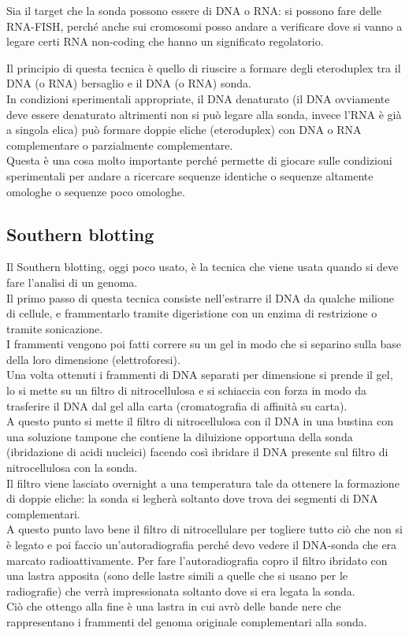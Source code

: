 \documentclass[11pt]{book}
\begin{document}
Sia il target che la sonda possono essere di DNA o RNA: si possono fare delle RNA-FISH, perché anche sui cromosomi posso andare a verificare dove si vanno a legare certi RNA non-coding che hanno un significato regolatorio.

Il principio di questa tecnica è quello di riuscire a formare degli eteroduplex tra il DNA (o RNA) bersaglio e il DNA (o RNA) sonda.\\
In condizioni sperimentali appropriate, il DNA denaturato (il DNA ovviamente deve essere denaturato altrimenti non si può legare alla sonda, invece l’RNA è già a singola elica) può formare doppie eliche (eteroduplex) con DNA o RNA complementare o parzialmente complementare.\\ Questa è una cosa molto importante perché permette di giocare sulle condizioni sperimentali per andare a ricercare sequenze identiche o sequenze altamente omologhe o sequenze poco omologhe.


\subsection{Southern blotting}
Il Southern blotting, oggi poco usato, è la tecnica che viene usata quando si deve fare l’analisi di un genoma.\\
Il primo passo di questa tecnica consiste nell'estrarre il DNA da qualche milione di cellule, e frammentarlo tramite digeristione con un enzima di restrizione o tramite sonicazione.\\
I frammenti vengono poi fatti correre su un gel in modo che si separino sulla base della loro dimensione (elettroforesi).\\
Una volta ottenuti i frammenti di DNA separati per dimensione si prende il gel, lo si mette su un filtro di nitrocellulosa e si schiaccia con forza in modo da trasferire il DNA dal gel alla carta (cromatografia di affinità su carta).\\
A questo punto si mette il filtro di nitrocellulosa con il DNA in una bustina con una soluzione tampone che contiene la diluizione opportuna della sonda (ibridazione di acidi nucleici) facendo così ibridare il DNA presente sul filtro di nitrocellulosa con la sonda.\\
Il filtro viene lasciato overnight a una temperatura tale da ottenere la formazione di doppie eliche: la sonda si legherà soltanto dove trova dei segmenti di DNA complementari.\\
A questo punto lavo bene il filtro di nitrocellulare per togliere tutto ciò che non si è legato e poi faccio un’autoradiografia perché devo vedere il DNA-sonda che era marcato radioattivamente. Per fare l’autoradiografia copro il filtro ibridato con una lastra apposita (sono delle lastre simili a quelle che si usano per le radiografie) che verrà impressionata soltanto dove si era legata la sonda.\\
Ciò che ottengo alla fine è una lastra in cui avrò delle bande nere che rappresentano i frammenti del genoma originale complementari alla sonda. 
\end{document}
